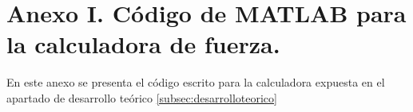 \section*{Anexo I. Código de MATLAB para la calculadora de fuerza.}
\label{sec:anexo1}
En este anexo se presenta el código escrito para la calculadora expuesta en el apartado de desarrollo teórico \ref{subsec:desarrolloteorico}